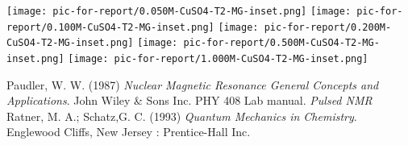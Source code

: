 \documentclass{article}
\begin{document}
{\begin{multicols}{2}
\label{fig:28}
\texttt{[image: pic-for-report/0.050M-CuSO4-T2-MG-inset.png]}
\label{fig:29}
\texttt{[image: pic-for-report/0.100M-CuSO4-T2-MG-inset.png]}
\label{fig:30}
\texttt{[image: pic-for-report/0.200M-CuSO4-T2-MG-inset.png]}
\label{fig:31}
\texttt{[image: pic-for-report/0.500M-CuSO4-T2-MG-inset.png]}
\label{fig:32}
\texttt{[image: pic-for-report/1.000M-CuSO4-T2-MG-inset.png]}
\label{fig:33}



\begin{thebibliography}{9}
Paudler, W. W. (1987) \emph{Nuclear Magnetic Resonance General 
Concepts and Applications}. John Wiley \& Sons Inc.
PHY 408 Lab manual. \emph{Pulsed NMR}
Ratner, M. A.; Schatz,G. C. (1993) \emph{Quantum Mechanics in Chemistry}. 
Englewood Cliffs, New Jersey : Prentice-Hall Inc.
\end{thebibliography}
\end{multicols}
}
\end{document}
